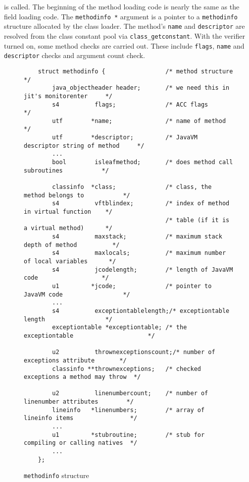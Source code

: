 is called. The beginning of the method loading code is nearly the same
as the field loading code. The \texttt{methodinfo *} argument is a
pointer to a \texttt{methodinfo} structure allocated by the class
loader. The method's \texttt{name} and \texttt{descriptor} are
resolved from the class constant pool via
\texttt{class\_getconstant}. With the verifier turned on, some method
checks are carried out. These include \texttt{flags}, \texttt{name}
and \texttt{descriptor} checks and argument count check.

\begin{figure}[h]
\begin{verbatim}
    struct methodinfo {                 /* method structure                       */
        java_objectheader header;       /* we need this in jit's monitorenter     */
        s4          flags;              /* ACC flags                              */
        utf        *name;               /* name of method                         */
        utf        *descriptor;         /* JavaVM descriptor string of method     */
        ...
        bool        isleafmethod;       /* does method call subroutines           */

        classinfo  *class;              /* class, the method belongs to           */
        s4          vftblindex;         /* index of method in virtual function    */
                                        /* table (if it is a virtual method)      */
        s4          maxstack;           /* maximum stack depth of method          */
        s4          maxlocals;          /* maximum number of local variables      */
        s4          jcodelength;        /* length of JavaVM code                  */
        u1         *jcode;              /* pointer to JavaVM code                 */
        ...
        s4          exceptiontablelength;/* exceptiontable length                 */
        exceptiontable *exceptiontable; /* the exceptiontable                     */

        u2          thrownexceptionscount;/* number of exceptions attribute       */
        classinfo **thrownexceptions;   /* checked exceptions a method may throw  */

        u2          linenumbercount;    /* number of linenumber attributes        */
        lineinfo   *linenumbers;        /* array of lineinfo items                */
        ...
        u1         *stubroutine;        /* stub for compiling or calling natives  */
        ...
    };
\end{verbatim}
\caption{\texttt{methodinfo} structure}
\label{methodinfostructure}
\end{figure}

